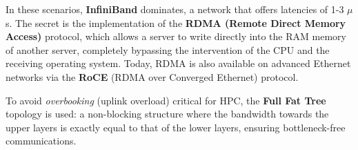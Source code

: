 In these scenarios, \textbf{InfiniBand} dominates, a network that offers latencies of 1-3 $\mu$s. The secret is the implementation of the \textbf{RDMA (Remote Direct Memory Access)} protocol, which allows a server to write directly into the RAM memory of another server, completely bypassing the intervention of the CPU and the receiving operating system.
Today, RDMA is also available on advanced Ethernet networks via the \textbf{RoCE} (RDMA over Converged Ethernet) protocol.

\begin{definitionbox}
To avoid \textit{overbooking} (uplink overload) critical for HPC, the \textbf{Full Fat Tree} topology is used: a non-blocking structure where the bandwidth towards the upper layers is exactly equal to that of the lower layers, ensuring bottleneck-free communications.
\end{definitionbox}
